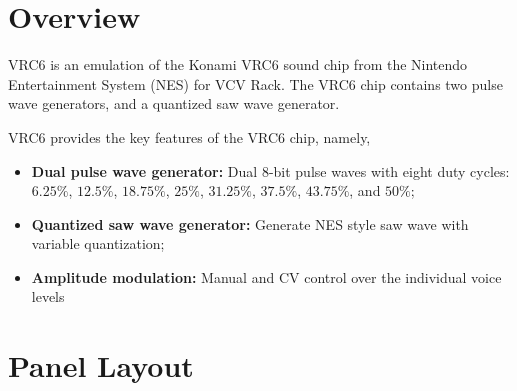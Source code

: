 \documentclass[12pt,letter]{article}
\begin{document}


\section{Overview}

VRC6 is an emulation of the Konami VRC6 sound chip from the Nintendo Entertainment System (NES) for VCV Rack. The VRC6 chip contains two pulse wave generators, and a quantized saw wave generator.

VRC6 provides the key features of the VRC6 chip, namely,
\begin{itemize}
  \item \textbf{Dual pulse wave generator:} Dual 8-bit pulse waves with eight duty cycles: $6.25\%$, $12.5\%$, $18.75\%$, $25\%$, $31.25\%$, $37.5\%$, $43.75\%$, and $50\%$;
  \item \textbf{Quantized saw wave generator:} Generate NES style saw wave with variable quantization;
  \item \textbf{Amplitude modulation:} Manual and CV control over the individual voice levels
\end{itemize}


\clearpage
\section{Panel Layout}
\end{document}
